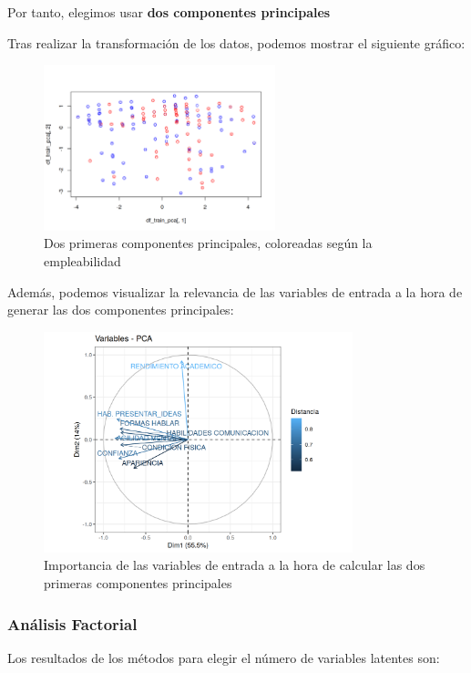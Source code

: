 \documentclass[11pt]{article}
\begin{document}
Por tanto, elegimos usar \textbf{dos componentes principales}

Tras realizar la transformación de los datos, podemos mostrar el siguiente gráfico:

\begin{figure}[H]
    \centering
    \includegraphics[width=0.60\textwidth]{scatter_plot_pca}
    \caption{Dos primeras componentes principales, coloreadas según la empleabilidad}
\end{figure}

Además, podemos visualizar la relevancia de las variables de entrada a la hora de generar las dos componentes principales:

\begin{figure}[H]
    \centering
    \includegraphics[width=0.8\textwidth]{pca_ejes}
    \caption{Importancia de las variables de entrada a la hora de calcular las dos primeras componentes principales}
\end{figure}

\subsubsection{Análisis Factorial}


Los resultados de los métodos para elegir el número de variables latentes son:
\end{document}
